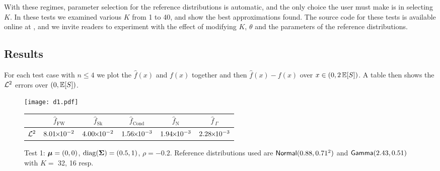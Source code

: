 With these regimes, parameter selection for the reference distributions is automatic, and the only choice the user must make is in selecting $K$. In these tests we examined various $K$ from 1 to 40, and show the best approximations found.
The source code for these tests is available online at \cite{OrthogoCode}, and we invite readers to experiment with the effect of modifying $K$, $\theta$ and the parameters of the reference distributions.

\subsection{Results}

For each test case with $n \le 4$ we plot the $\widehat{f}(x)$ and $f(x)$ together and then $\widehat{f}(x)-f(x)$ over $x \in (0, 2\operatorname{{\mathbb E}}[S])$. A table then shows the $\mathcal{L}^2$ errors over $(0, \operatorname{{\mathbb E}}[S])$. %
\setlength\extrarowheight{3pt}

\begin{figure}[H]
\centering
\texttt{[image: d1.pdf]}

\vspace{4mm}

\begin{tabular}{c|c|c|c|c|c|}
\cline{2-6}
                         & $\widehat{f}_{\mathrm{FW}}$  & $\widehat{f}_{\mathrm{Sk}}$ & $\widehat{f}_{\mathrm{Cond}}$ & $\widehat{f}_{\mathrm{N}}$  & $\widehat{f}_{\,\Gamma}$ \\ \hline
\multicolumn{1}{|c|}{$\mathcal{L}^2$} & $8.01 {\mkern-2mu\times\mkern-2mu} 10^{-2}$ & $4.00 {\mkern-2mu\times\mkern-2mu} 10^{-2}$ & $1.56 {\mkern-2mu\times\mkern-2mu} 10^{-3}$ & $1.94 {\mkern-2mu\times\mkern-2mu} 10^{-3}$ & $2.28 {\mkern-2mu\times\mkern-2mu} 10^{-3}$ \\  \hline
\end{tabular}
\caption*{Test 1: $\bm{\mu} = (0, 0)$, $\mathrm{diag}(\bm{\Sigma}) = (0.5, 1)$, $\rho = -0.2$. Reference distributions used are $\mathsf{Normal}(0.88,0.71^2)$ and $\mathsf{Gamma}(2.43,0.51)$ with $K =$ 32, 16 resp.}
\end{figure}




